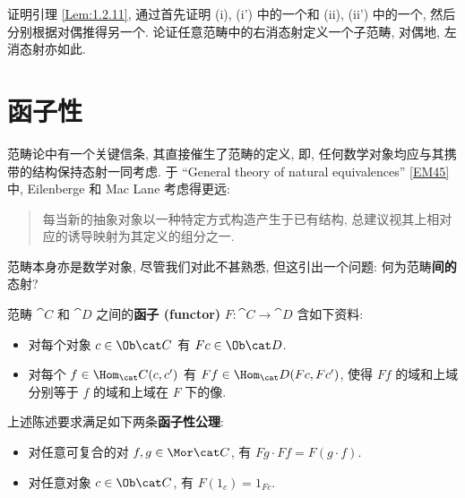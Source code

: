 \Exercises
{}\exercise\label{Exc:1.2.iii}{%
    证明引理 \ref{Lem:1.2.11}, 通过首先证明 (i), (i') 中的一个和 (ii), (ii') 中的一个, 然后分别根据对偶推得另一个. 论证任意范畴中的右消态射定义一个子范畴, 对偶地, 左消态射亦如此.
}

\section{函子性}\label{Sec:Functoriality} %
 \par 范畴论中有一个关键信条, 其直接催生了范畴的定义, 即, 任何数学对象均应与其携带的结构保持态射一同考虑. 于 ``General theory of natural equivalences'' \ref{EM45} 中, Eilenberge 和 Mac Lane 考虑得更远:\begin{quote}
    每当新的抽象对象以一种特定方式构造产生于已有结构, 总建议视其上相对应的诱导映射为其定义的组分之一.
 \end{quote}
 范畴本身亦是数学对象, 尽管我们对此不甚熟悉, 但这引出一个问题: 何为范畴\textbf{间的}态射?
 \begin{definition}
    范畴 \(\cat C\) 和 \(\cat D\) 之间的\textbf{函子 (functor)} \(F\colon\cat C\to\cat D\) 含如下资料:
    \begin{itemize}
        \item 对每个对象 \(c\in\Ob\cat C\) 有 \(Fc\in\Ob\cat D\).
        \item 对每个 \(f\in\Hom_\cat C(c,c')\) 有 \(Ff\in\Hom_\cat D(Fc,Fc')\), 使得 \(Ff\) 的域和上域分别等于 \(f\) 的域和上域在 \(F\) 下的像.
    \end{itemize}
    上述陈述要求满足如下两条\textbf{函子性公理}:
    \begin{itemize}
        \item 对任意可复合的对 \(f,g\in\Mor\cat C\), 有 \(Fg\cdot Ff=F(g\cdot f)\).
        \item 对任意对象 \(c\in\Ob\cat C\), 有 \(F(1_c)=1_{Fc}\).
    \end{itemize}
 \end{definition}